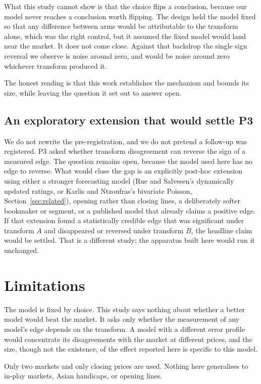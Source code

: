 \documentclass[11pt,a4paper]{article}
\begin{document}
What this study cannot show is that the choice flips a conclusion, because our
model never reaches a conclusion worth flipping. The design held the model
fixed so that any difference between arms would be attributable to the
transform alone, which was the right control, but it assumed the fixed model
would land near the market. It does not come close. Against that backdrop the
single sign reversal we observe is noise around zero, and would be noise around
zero whichever transform produced it.

The honest reading is that this work establishes the mechanism and bounds its
size, while leaving the question it set out to answer open.

\subsection{An exploratory extension that would settle P3}
\label{sec:extension}

We do not rewrite the pre-registration, and we do not pretend a follow-up was
registered. P3 asked whether transform disagreement can reverse the sign of a
measured edge. The question remains open, because the model used here has no
edge to reverse. What would close the gap is an explicitly post-hoc extension
using either a stronger forecasting model (Rue and Salvesen's dynamically
updated ratings, or Karlis and Ntzoufras's bivariate Poisson,
Section~\ref{sec:related}), opening rather than closing lines, a deliberately
softer bookmaker or segment, or a published model that already claims a
positive edge. If that extension found a statistically credible edge that was
significant under transform $A$ and disappeared or reversed under transform
$B$, the headline claim would be settled. That is a different study; the
apparatus built here would run it unchanged.

\section{Limitations}
\label{sec:limitations}

The model is fixed by choice. This study says nothing about whether a better
model would beat the market. It asks only whether the measurement of any
model's edge depends on the transform. A model with a different error profile
would concentrate its disagreements with the market at different prices, and
the size, though not the existence, of the effect reported here is specific
to this model.

Only two markets and only closing prices are used. Nothing here generalises to
in-play markets, Asian handicaps, or opening lines.
\end{document}
